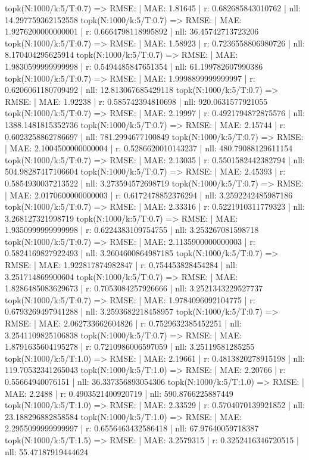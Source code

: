 topk(N:1000/k:5/T:0.7) => RMSE: | MAE: 1.81645 | r: 0.682685843010762 | nll: 14.297759362152558
topk(N:1000/k:5/T:0.7) => RMSE: | MAE: 1.9276200000000001 | r: 0.6664798118995892 | nll: 36.45742713723206
topk(N:1000/k:5/T:0.7) => RMSE: | MAE: 1.58923 | r: 0.7236558806980726 | nll: 8.170404295625914
topk(N:1000/k:5/T:0.7) => RMSE: | MAE: 1.9830599999999998 | r: 0.5494485847651354 | nll: 61.199782607990386
topk(N:1000/k:5/T:0.7) => RMSE: | MAE: 1.9998899999999997 | r: 0.6206061180709492 | nll: 12.813067685429118
topk(N:1000/k:5/T:0.7) => RMSE: | MAE: 1.92238 | r: 0.585742394810698 | nll: 920.0631577921055
topk(N:1000/k:5/T:0.7) => RMSE: | MAE: 2.19997 | r: 0.4921794872875576 | nll: 1388.1481815352736
topk(N:1000/k:5/T:0.7) => RMSE: | MAE: 2.15744 | r: 0.6023258862786697 | nll: 781.2994677100849
topk(N:1000/k:5/T:0.7) => RMSE: | MAE: 2.1004500000000004 | r: 0.5286620010143237 | nll: 480.79088129611154
topk(N:1000/k:5/T:0.7) => RMSE: | MAE: 2.13035 | r: 0.5501582442382794 | nll: 504.98287417106604
topk(N:1000/k:5/T:0.7) => RMSE: | MAE: 2.45393 | r: 0.5854930037213522 | nll: 3.273594572698719
topk(N:1000/k:5/T:0.7) => RMSE: | MAE: 2.0170600000000003 | r: 0.6172478852376294 | nll: 3.2592242485987186
topk(N:1000/k:5/T:0.7) => RMSE: | MAE: 2.33316 | r: 0.5221910311779323 | nll: 3.268127321998719
topk(N:1000/k:5/T:0.7) => RMSE: | MAE: 1.9350999999999998 | r: 0.6224383109754755 | nll: 3.253267081598718
topk(N:1000/k:5/T:0.7) => RMSE: | MAE: 2.1135900000000003 | r: 0.5824169827922493 | nll: 3.2604600864987185
topk(N:1000/k:5/T:0.7) => RMSE: | MAE: 1.922817874982847 | r: 0.754453828454284 | nll: 3.251714869900604
topk(N:1000/k:5/T:0.7) => RMSE: | MAE: 1.8286485083629673 | r: 0.7053084257926666 | nll: 3.2521343229527737
topk(N:1000/k:5/T:0.7) => RMSE: | MAE: 1.9784096092104775 | r: 0.6793269497941288 | nll: 3.2593682218458957
topk(N:1000/k:5/T:0.7) => RMSE: | MAE: 2.062733662604826 | r: 0.7529632385452251 | nll: 3.2541109825106838
topk(N:1000/k:5/T:0.7) => RMSE: | MAE: 1.8791635604195278 | r: 0.7210986006597059 | nll: 3.25119581285255
topk(N:1000/k:5/T:1.0) => RMSE: | MAE: 2.19661 | r: 0.4813820278915198 | nll: 119.70532341265043
topk(N:1000/k:5/T:1.0) => RMSE: | MAE: 2.20766 | r: 0.55664940076151 | nll: 36.337356893054306
topk(N:1000/k:5/T:1.0) => RMSE: | MAE: 2.2488 | r: 0.4903521400920719 | nll: 590.8766225887449
topk(N:1000/k:5/T:1.0) => RMSE: | MAE: 2.33529 | r: 0.5704070139921852 | nll: 23.188296882858584
topk(N:1000/k:5/T:1.0) => RMSE: | MAE: 2.2955099999999997 | r: 0.6556463432586418 | nll: 67.97640059718387
topk(N:1000/k:5/T:1.5) => RMSE: | MAE: 3.2579315 | r: 0.3252416346720515 | nll: 55.47187919444624
